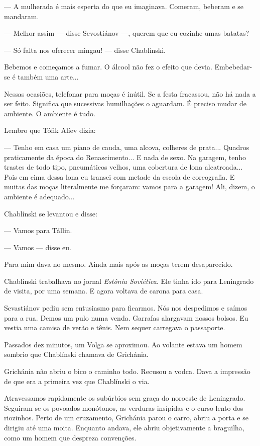 --- A mulherada é mais esperta do que eu imaginava. Comeram, beberam e
se mandaram.

--- Melhor assim --- disse Sevostiánov ---, querem que eu cozinhe umas
batatas?

--- Só falta nos oferecer mingau! --- disse Chablínski.

Bebemos e começamos a fumar. O álcool não fez o efeito que devia.
Embebedar-se é também uma arte...

Nessas ocasiões, telefonar para moças é inútil. Se a festa fracassou,
não há nada a ser feito. Significa que sucessivas humilhações o
aguardam. É preciso mudar de ambiente. O ambiente é tudo.

Lembro que Tófik Alíev dizia:

--- Tenho em casa um piano de cauda, uma alcova, colheres de prata...
Quadros praticamente da época do Renascimento... E nada de sexo. Na
garagem, tenho trastes de todo tipo, pneumáticos velhos, uma cobertura
de lona alcatroada... Pois em cima dessa lona eu transei com metade da
escola de coreografia. E muitas das moças literalmente me forçaram:
vamos para a garagem! Ali, dizem, o ambiente é adequado...

Chablínski se levantou e disse:

--- Vamos para Tállin.

--- Vamos --- disse eu.

Para mim dava no mesmo. Ainda mais após as moças terem desaparecido.

Chablínski trabalhava no jornal \emph{Estônia Soviética}. Ele tinha ido
para Leningrado de visita, por uma semana. E agora voltava de carona
para casa.

Sevastiánov pediu sem entusiasmo para ficarmos. Nós nos despedimos e
saímos para a rua. Demos um pulo numa venda. Garrafas alargavam nossos
bolsos. Eu vestia uma camisa de verão e tênis. Nem sequer carregava o
passaporte.

Passados dez minutos, um Volga se aproximou. Ao volante estava um homem
sombrio que Chablínski chamava de Grichánia.

Grichánia não abriu o bico o caminho todo. Recusou a vodca. Dava a
impressão de que era a primeira vez que Chablínski o via.

Atravessamos rapidamente os subúrbios sem graça do noroeste de
Leningrado. Seguiram-se os povoados monótonos, as verduras insípidas e o
curso lento dos riozinhos. Perto de um cruzamento, Grichánia parou o
carro, abriu a porta e se dirigiu até uma moita. Enquanto andava, ele
abriu objetivamente a braguilha, como um homem que despreza convenções.

